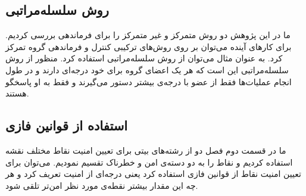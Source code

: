 \subsection{روش سلسله‌مراتبی}
ما در این پژوهش دو روش متمرکز و غیر متمرکز را برای فرماندهی بررسی کردیم. برای کارهای آینده می‌توان  بر روی روش‌های ترکیبی کنترل و فرماندهی گروه تمرکز کرد. به عنوان مثال می‌توان از روش سلسله‌مراتبی استفاده کرد. منظور از روش سلسله‌مراتبی این است که هر یک اعضای گروه برای خود درجه‌ای دارند و در طول انجام عملیات‌ها فقط از عضو با درجه‌ی بیشتر دستور می‌گیرند و فقط به او پاسخگو هستند.
\subsection{استفاده از قوانین فازی}
ما در قسمت دوم فصل دو از رشته‌های بیتی برای تعیین امنیت نقاط مختلف نقشه استفاده کردیم و نقاط را به دو دسته‌ی امن و خطرناک تقسیم نمودیم. می‌توان برای تعیین امنیت نقاط از قوانین فازی استفاده کرد یعنی درجه‌ای از امنیت تعریف کرد و هر چه این مقدار بیشتر نقطه‌ی مورد نظر امن‌تر تلقی شود.
\newpage
